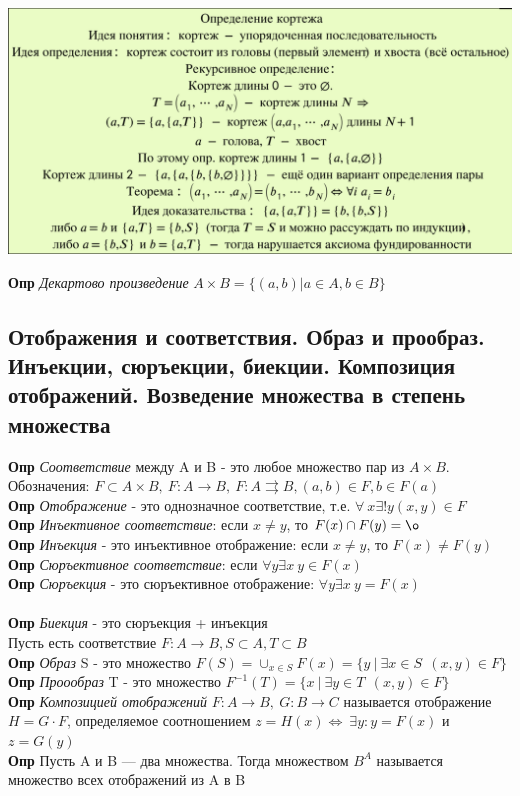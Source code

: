 \begin{center}
    \includegraphics[width = 14cm]{images/2 (определения)_21.PNG}
\end{center}
\textbf{Опр} \textit{Декартово произведение} $A \times B = \{(a,b) | a \in A, b \in B\}$

\subsection{Отображения и соответствия. Образ и прообраз. Инъекции, сюръекции, биекции. Композиция отображений. Возведение множества в степень множества}

\textbf{Опр} \textit{Соответствие} между A и B - это любое множество пар из $A \times B$. Обозначения: $F \subset A \times B, \ F:A\rightarrow B, \ F: A \rightrightarrows B, (a,b) \in F, b \in F(a)$
\\
\textbf{Опр} \textit{Отображение} - это однозначное соответствие, т.е. $\forall \ x \exists!y (x,y) \in F $ 
\\
\textbf{Опр} \textit{Инъективное соответствие}: если $x \neq y$, то $F(x) \cap F(y) = \o$
\\
\textbf{Опр} \textit{Инъекция} - это инъективное отображение: если $x \neq y$, то $F(x) \neq F(y)$
\\
\textbf{Опр} \textit{Сюръективное соответствие}: если $\forall y \exists x \ y \in F(x)$
\\
\textbf{Опр} \textit{Сюръекция} - это сюръективное отображение:  $\forall y \exists x \ y = F(x)$
\\
\\
\textbf{Опр} \textit{Биекция} - это сюръекция + инъекция
\\
Пусть есть соответствие $F: A \rightarrow B, S \subset A, T \subset B$\\
\textbf{Опр} \textit{Образ} S - это множество $F(S) = \cup_{x \in S} F(x) = \{y \ |  \ \exists x \in S \ \ (x,y) \in F\}$
\\
\textbf{Опр} \textit{Проообраз} T - это множество $F^{-1}(T) = \{x \ | \ \exists y\in T \ \ (x,y) \in F\}$
\\
\textbf{Опр} \textit{Композицией отображений} $F : A \rightarrow B, \ G : B \rightarrow C$ называется отображение $H = G \cdot F$, определяемое соотношением $z = H(x) \Longleftrightarrow \ \exists y: y = F(x) $ и $z = G(y)$
\\
\textbf{Опр}
Пусть A и B — два множества. Тогда множеством  $B^A$ называется множество всех отображений из A в B
\\
